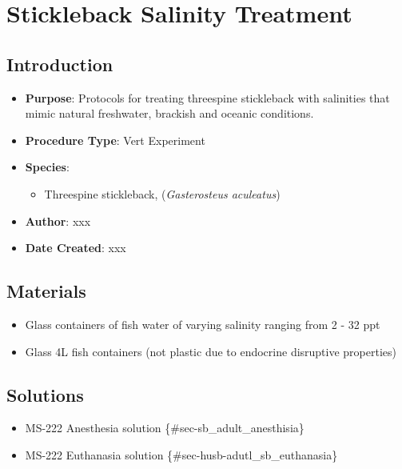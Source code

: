 \documentclass[
  letterpaper,
  DIV=11,
  numbers=noendperiod]{scrreprt}
\providecommand{\tightlist}{%
  \setlength{\itemsep}{0pt}\setlength{\parskip}{0pt}}\usepackage{longtable,booktabs,array}
\begin{document}
\hypertarget{sec-vert_exp-salinity_exp_SB}{%
\chapter{Stickleback Salinity
Treatment}\label{sec-vert_exp-salinity_exp_SB}}

\hypertarget{introduction-82}{%
\section{Introduction}\label{introduction-82}}

\begin{itemize}
\tightlist
\item
  \textbf{Purpose}: Protocols for treating threespine stickleback with
  salinities that mimic natural freshwater, brackish and oceanic
  conditions.
\item
  \textbf{Procedure Type}: Vert Experiment
\item
  \textbf{Species}:

  \begin{itemize}
  \tightlist
  \item
    Threespine stickleback, (\emph{Gasterosteus aculeatus})
  \end{itemize}
\item
  \textbf{Author}: xxx
\item
  \textbf{Date Created}: xxx
\end{itemize}

\hypertarget{materials-78}{%
\section{Materials}\label{materials-78}}

\begin{itemize}
\tightlist
\item
  Glass containers of fish water of varying salinity ranging from 2 - 32
  ppt
\item
  Glass 4L fish containers (not plastic due to endocrine disruptive
  properties)
\end{itemize}

\hypertarget{solutions-70}{%
\section{Solutions}\label{solutions-70}}

\begin{itemize}
\tightlist
\item
  MS-222 Anesthesia solution \{\#sec-sb\_adult\_anesthisia\}
\item
  MS-222 Euthanasia solution \{\#sec-husb-adutl\_sb\_euthanasia\}
\end{itemize}
\end{document}
